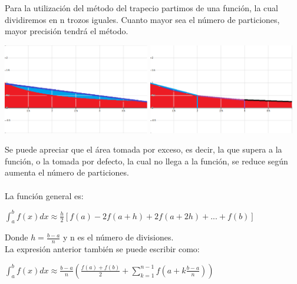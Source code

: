 \documentclass{article}
\begin{document}
      Para la utilización del método del trapecio partimos de una función, la cual dividiremos en n trozos iguales. Cuanto mayor sea el número de particiones, mayor precisión tendrá el método.\\

  	\begin{center}
         \includegraphics[width=0.48\textwidth]{img2.eps}
	 \includegraphics[width=0.48\textwidth]{img3.eps}
        \end{center}


      Se puede apreciar que el área tomada por exceso, es decir, la que supera a la función, o la tomada por defecto, la cual no llega a la función, se reduce según aumenta el número de particiones. \\
      \\

      La función general es: 
        
      \begin{center}
   
        $\int_{a}^{b}f(x)dx \approx \frac{h}{2}[f(a)-2f(a+h)+2f(a+2h)+...+f(b)]$

      \end{center}
 
      Donde $h=\frac{b-a}{n}$ y n es el número de divisiones.\\

      La expresión anterior también se puede escribir como:

      \begin{center}

        $\int_{a}^{b}f(x)dx \approx \frac{b-a}{n}(\frac{f(a)+f(b)}{2}+\sum\limits_{k=1}^{n-1}f(a+k\frac{b-a}{n}))$
      \end{center}
\end{document}
